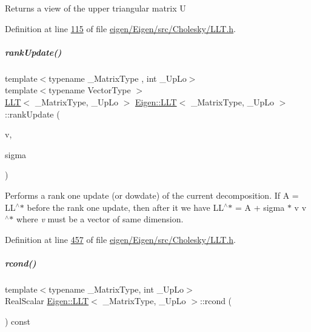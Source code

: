 \begin{DoxyReturn}{Returns}
a view of the upper triangular matrix U 
\end{DoxyReturn}


Definition at line \hyperlink{eigen_2_eigen_2src_2_cholesky_2_l_l_t_8h_source_l00115}{115} of file \hyperlink{eigen_2_eigen_2src_2_cholesky_2_l_l_t_8h_source}{eigen/\+Eigen/src/\+Cholesky/\+L\+L\+T.\+h}.

\mbox{\label{group___cholesky___module_ac70d4de31a3626c76c6ea3833af5fa6f}} 
\subparagraph{\texorpdfstring{rank\+Update()}{rankUpdate()}}
{\footnotesize\ttfamily template$<$typename \+\_\+\+Matrix\+Type , int \+\_\+\+Up\+Lo$>$ \\
template$<$typename Vector\+Type $>$ \\
\hyperlink{group___cholesky___module_class_eigen_1_1_l_l_t}{L\+LT}$<$ \+\_\+\+Matrix\+Type, \+\_\+\+Up\+Lo $>$ \hyperlink{group___cholesky___module_class_eigen_1_1_l_l_t}{Eigen\+::\+L\+LT}$<$ \+\_\+\+Matrix\+Type, \+\_\+\+Up\+Lo $>$\+::rank\+Update (\begin{DoxyParamCaption}\item[{const \hyperlink{struct_vector_type}{Vector\+Type} \&}]{v,  }\item[{const Real\+Scalar \&}]{sigma }\end{DoxyParamCaption})}

Performs a rank one update (or dowdate) of the current decomposition. If A = L\+L$^\wedge$$\ast$ before the rank one update, then after it we have L\+L$^\wedge$$\ast$ = A + sigma $\ast$ v v$^\wedge$$\ast$ where {\itshape v} must be a vector of same dimension. 

Definition at line \hyperlink{eigen_2_eigen_2src_2_cholesky_2_l_l_t_8h_source_l00457}{457} of file \hyperlink{eigen_2_eigen_2src_2_cholesky_2_l_l_t_8h_source}{eigen/\+Eigen/src/\+Cholesky/\+L\+L\+T.\+h}.

\mbox{\label{group___cholesky___module_a59338fa78db171d02fd5a2c9e4f3a30c}} 
\subparagraph{\texorpdfstring{rcond()}{rcond()}\hspace{0.1cm}{\footnotesize\ttfamily [1/2]}}
{\footnotesize\ttfamily template$<$typename \+\_\+\+Matrix\+Type, int \+\_\+\+Up\+Lo$>$ \\
Real\+Scalar \hyperlink{group___cholesky___module_class_eigen_1_1_l_l_t}{Eigen\+::\+L\+LT}$<$ \+\_\+\+Matrix\+Type, \+\_\+\+Up\+Lo $>$\+::rcond (\begin{DoxyParamCaption}{ }\end{DoxyParamCaption}) const\hspace{0.3cm}{\ttfamily [inline]}}

